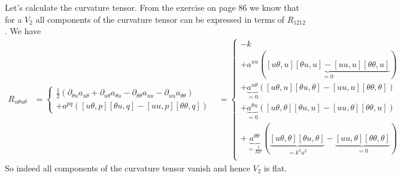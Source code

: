 Let's calculate the curvature tensor. From the exercise on page 86 we know that for a $V_2$ all components of the curvature tensor can be expressed in terms of $R_{1212}$. We have
\begin{align}
R_{u\theta u\theta} &= \left \{ \begin{array}{l}
\frac{1}{2}\left(\partial_{\theta u}a_{u \theta}+\partial_{u \theta}a_{\theta u}-\partial_{\theta \theta}a_{uu}-\partial_{u u}a_{\theta \theta}  \right) \\
 + a^{pq}\left([u \theta,p][\theta u,q] -[u u,p][\theta \theta,q]  \right)
\end{array} \right.
&= \left \{ \begin{array}{l}
-k \\
 + a^{uu}\left(\underbrace{[u \theta,u][\theta u,u] -[u u,u][\theta \theta,u]}_{=0}  \right)\\
 + \underbrace{a^{u \theta}}_{=0}\left([u \theta,u][\theta u,\theta] -[u u,u][\theta \theta,\theta]  \right)\\
 + \underbrace{a^{\theta u}}_{=0}\left([u \theta,\theta][\theta u,u] -[u u,\theta][\theta \theta,u]  \right)\\
 + \underbrace{a^{\theta \theta}}_{=\frac{1}{ku^2}}\left(\underbrace{[u \theta,\theta][\theta u,\theta]}_{= k^2u^2} -\underbrace{[u u,\theta][\theta \theta,\theta]}_{=0}  \right)\\
\end{array} \right.
\end{align}
So indeed all components of the curvature tensor vanish and hence $V_2$ is flat.

